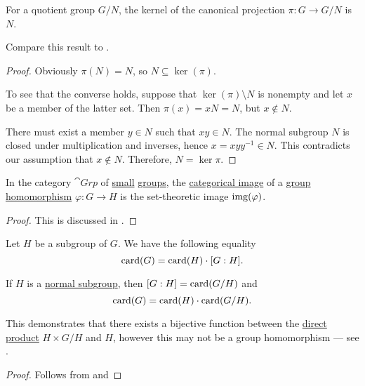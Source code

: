 \begin{proposition}\label{thm:group_kernel_of_canonical_projection}
  For a quotient group \( G / N \), the kernel of the canonical projection \( \pi: G \to G / N \) is \( N \).

  Compare this result to .
\end{proposition}
\begin{proof}
  Obviously \( \pi(N) = N \), so \( N \subseteq \ker(\pi) \).

  To see that the converse holds, suppose that \( \ker(\pi) \setminus N \) is nonempty and let \( x \) be a member of the latter set. Then \( \pi(x) = xN = N \), but \( x \not\in N \).

  There must exist a member \( y \in N \) such that \( xy \in N \). The normal subgroup \( N \) is closed under multiplication and inverses, hence \( x = xyy^{-1} \in N \). This contradicts our assumption that \( x \not\in N \). Therefore, \( N = \ker \pi \).
\end{proof}

\begin{proposition}\label{thm:cokernels_in_grp}
  In the category \hyperref[def:group/category]{\( \cat{Grp} \)} of \hyperref[def:category_size]{small} \hyperref[def:group]{groups}, the \hyperref[def:zero_morphisms/image]{categorical image} of a \hyperref[def:group/homomorphism]{group homomorphism} \( \varphi: G \to H \) is the set-theoretic image \( \operatorname{img}(\varphi) \).
\end{proposition}
\begin{proof}
  This is discussed in .
\end{proof}

\begin{theorem}\label{thm:lagranges_theorem_for_groups}
  Let \( H \) be a subgroup of \( G \). We have the following equality
  \begin{equation}\label{eq:thm:lagranges_theorem_for_groups/index}
    \operatorname{card}(G) = \operatorname{card}(H) \cdot [G : H].
  \end{equation}

  If \( H \) is a \hyperref[def:normal_subgroup]{normal subgroup}, then \( [G : H] = \operatorname{card}(G / H) \) and
  \begin{equation}\label{eq:thm:lagranges_theorem_for_groups/card}
    \operatorname{card}(G) = \operatorname{card}(H) \cdot \operatorname{card}(G / H).
  \end{equation}

  This demonstrates that there exists a bijective function between the \hyperref[def:monoid_direct_product]{direct product} \( H \times G / H \) and \( H \), however this may not be a group homomorphism --- see .
\end{theorem}
\begin{proof}
  Follows from  and 
\end{proof}

